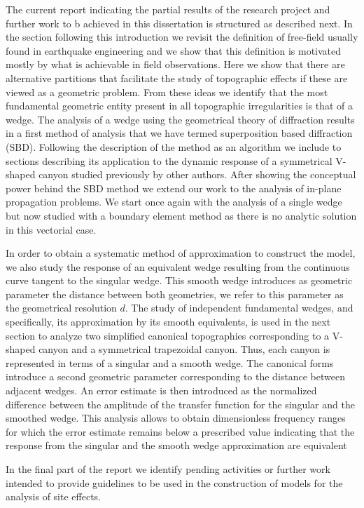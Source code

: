 \documentclass[11pt,letterpaper]{article}
\begin{document}
The current report indicating the partial results of the research project and further work to b achieved in this dissertation is structured as described next. In the section following this introduction we revisit the definition of free-field usually found in earthquake engineering and we show that this definition is motivated mostly by what is achievable in field observations. Here we show that there are alternative partitions that facilitate the study of topographic effects if these are viewed as a geometric problem. From these ideas we identify that the most fundamental geometric entity present in all topographic irregularities is that of a wedge. The analysis of a wedge using the geometrical theory of diffraction \citep{Jaramillo2012Analytic} results in a first method of analysis that we have termed superposition based diffraction (SBD). Following the description of the method as an algorithm we include to sections describing its application to the dynamic response of a symmetrical V-shaped canyon studied previously by other authors. After showing the conceptual power behind the SBD method we extend our work to the analysis of in-plane propagation problems. We start once again with the analysis of a single wedge but now studied with a boundary element method as there is no analytic solution in this vectorial case.

In order to obtain a systematic method of approximation to construct the model, we also study the response of an equivalent wedge resulting from the continuous curve tangent to the singular wedge. This smooth wedge introduces as geometric parameter the distance between both geometries, we refer to this parameter as the geometrical resolution $d$. The study of independent fundamental wedges, and specifically, its approximation by its smooth equivalents, is used in the next section to analyze two simplified canonical topographies corresponding to a V-shaped canyon and a symmetrical trapezoidal canyon. Thus, each canyon is represented in terms of a singular and a smooth wedge. The canonical forms introduce a second geometric parameter corresponding to the distance between adjacent wedges. An error estimate is then introduced as the normalized difference between the amplitude of the transfer function for the singular and the smoothed wedge. This analysis allows to obtain dimensionless frequency ranges for which the error estimate remains below a prescribed value indicating that the response from the singular and the smooth wedge approximation are equivalent

In the final part of the report we identify pending activities or further work intended to provide guidelines to be used in the construction of models for the analysis of site effects.
\end{document}
